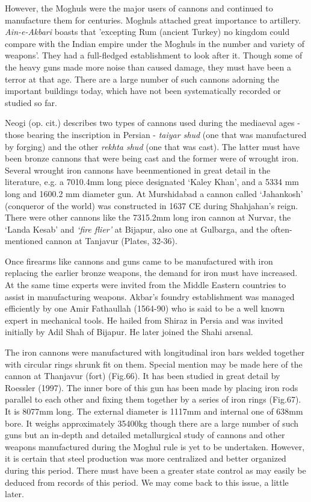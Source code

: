 However, the Moghuls were the major users of cannons and continued to manufacture them for centuries. Moghuls attached great importance to artillery. \textit{Ain-e-Akbari} boasts that 'excepting Rum (ancient Turkey) no kingdom could compare with the Indian empire under the Moghuls in the number and variety of weapons'. They had a full-fledged establishment to look after it. Though some of the heavy guns made more noise than caused damage, they must have been a terror at that age. There are a large number of such cannons adorning the important buildings today, which have not been systematically recorded or studied so far.

Neogi (op. cit.) describes two types of cannons used during the mediaeval ages - those bearing the inscription in Persian - \textit{taiyar shud} (one that was manufactured by forging) and the other \textit{rekhta shud} (one that was cast). The latter must have been bronze cannons that were being cast and the former were of wrought iron. Several wrought iron cannons have beenmentioned in great detail in the literature, e.g. a 7010.4mm long piece designated `Kaley Khan', and a 5334 mm long and 1600.2 mm diameter gun. At Murshidabad a cannon called `Jahankosh' (conqueror of the world) was constructed in 1637 CE during Shahjahan's reign. There were other cannons like the 7315.2mm long iron cannon at Nurvar, the `Landa Kesab' and \textit{`fire flier'} at Bijapur, also one at Gulbarga, and the often-mentioned cannon at Tanjavur (Plates, 32-36).

Once firearms like cannons and guns came to be manufactured with iron replacing the earlier bronze weapons, the demand for iron must have increased. At the same time experts were invited from the Middle Eastern countries to assist in manufacturing weapons. Akbar's foundry establishment was managed efficiently by one Amir Fathaullah (1564-90) who is said to be a well known expert in mechanical tools. He hailed from Shiraz in Persia and was invited initially by Adil Shah of Bijapur. He later joined the Shahi arsenal.

The iron cannons were manufactured with longitudinal iron bars welded together with circular rings shrunk fit on them. Special mention may be made here of the cannon at Thanjavur (fort) (Fig.66). It has been studied in great detail by Roessler (1997). The inner bore of this gun has been made by placing iron rods parallel to each other and fixing them together by a series of iron rings (Fig.67). It is 8077mm long. The external diameter is 1117mm and internal one of 638mm bore. It weighs approximately 35400kg though there are a large number of such guns but an in-depth and detailed metallurgical study of cannons and other weapons manufactured during the Moghul rule is yet to be undertaken. However, it is certain that steel production was more centralized and better organized during this period. There must have been a greater state control as may easily be deduced from records of this period. We may come back to this issue, a little later.


